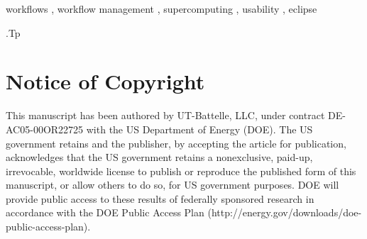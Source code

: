 \documentclass{elsart}
\begin{document}
\begin{frontmatter}
\begin{abstract}
\end{abstract}

\begin{keyword}
workflows
\sep 
workflow management
\sep
supercomputing
\sep
usability
\sep
eclipse

\vspace{1ex}

.Tp %

\end{keyword}

\end{frontmatter}

\section{Notice of Copyright}\label{notice-of-copyright}

This manuscript has been authored by UT-Battelle, LLC, under contract DE-AC05-00OR22725 with the US Department of Energy (DOE). The US government retains and the publisher, by accepting the article for publication, acknowledges that the US government retains a nonexclusive, paid-up, irrevocable, worldwide license to publish or reproduce the published form of this manuscript, or allow others to do so, for US government purposes. DOE will provide public access to these results of federally sponsored research in accordance with the DOE Public Access Plan (http://energy.gov/downloads/doe-public-access-plan).





\end{document}
